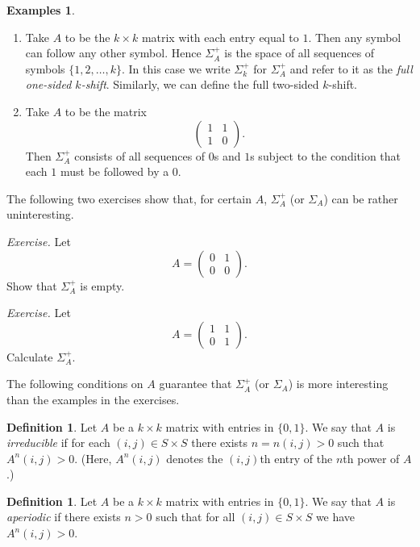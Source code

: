\documentclass[12pt]{article}
\theoremstyle{definition}
\newtheorem{definition}[theorem]{Definition}
\newtheorem{examples}[theorem]{Examples}
\theoremstyle{remark}
\begin{document}

\begin{examples}
\begin{enumerate}
\item
Take $A$ to be the $k \times k$ matrix with each entry equal to $1$.
Then any symbol can follow any other symbol.  Hence $\Sigma_{A}^{+}$
is the space of all sequences of symbols $\{1,2, \ldots, k\}$.  In
this case we write $\Sigma_{k}^{+}$ for $\Sigma_{A}^{+}$ and refer to
it as the {\it  full one-sided $k$-shift}.  Similarly, we can define
the full two-sided $k$-shift.
\item
Take $A$ to be the matrix
\[
 \left( \begin{array}{cc} 1 & 1 \\ 1 & 0 \end{array} \right).
\]
Then $\Sigma_{A}^{+}$ consists of all sequences of $0$s and $1$s
subject to the condition that each $1$ must be followed by a $0$.
\end{enumerate}
\end{examples}

The following two exercises show that, for certain $A$,
$\Sigma_{A}^{+}$ (or $\Sigma_{A}$) can be rather uninteresting.

\medskip
\noindent
{\it Exercise.}
Let
\[
 A = \left( \begin{array}{cc} 0 & 1 \\ 0 & 0 \end{array} \right).
\]
Show that $\Sigma_{A}^{+}$ is empty.



\medskip
\noindent
{\it Exercise.}
Let
\[
 A = \left( \begin{array}{cc} 1 & 1 \\ 0 & 1 \end{array} \right).
\]
Calculate $\Sigma_{A}^{+}$.

\medskip
The following conditions on $A$ guarantee that $\Sigma_{A}^{+}$ (or
$\Sigma_{A}$) is more interesting than the examples in the exercises.

\begin{definition}
Let $A$ be a $k \times k$ matrix with entries in $\{0,1\}$.  We say
that $A$ is {\it  irreducible} if for each $(i,j) \in S \times S$
there exists $n = n(i,j) > 0$ such that $A^{n}(i,j) > 0$.  (Here,
$A^{n}(i,j)$ denotes the $(i,j)$th entry of the $n$th power of $A$.)
\end{definition}
\begin{definition}
Let $A$ be a $k \times k$ matrix with entries in $\{0,1\}$.  We say
that $A$ is {\it  aperiodic} if there exists $n > 0$ such that for all
$(i,j) \in S \times S$ we have $A^{n}(i,j) > 0$.
\end{definition}
\end{document}
